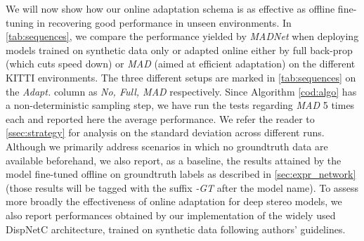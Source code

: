\documentclass[10pt,twocolumn,letterpaper]{article}
\def\netname{\emph{MADNet}}
\def\algoname{\emph{MAD}}
\begin{document}
We will now show how our online adaptation schema is as effective as offline fine-tuning in recovering good performance in unseen environments. In \autoref{tab:sequences}, we compare the performance yielded by \netname{} when deploying  models trained on synthetic data only \cite{mayer2016large} or adapted online either by full back-prop (which cuts speed down) or \algoname{} (aimed at efficient adaptation) on the different KITTI environments. The three different setups are marked in \autoref{tab:sequences} on the \textit{Adapt.} column as \textit{No, Full, \algoname{}} respectively. Since Algorithm \autoref{cod:algo} has a non-deterministic sampling step, we have run the tests regarding \algoname{} 5 times each and reported here the average performance. We refer the reader to \autoref{ssec:strategy} for analysis on the standard deviation across different runs.  Although we primarily address scenarios in which no groundtruth data are available beforehand, we also report, as a baseline, the results attained by the model fine-tuned offline on groundtruth labels as described in \autoref{sec:expr_network} (those results will be tagged with the suffix \textit{-GT} after the model name). To assess more broadly the effectiveness of online adaptation for deep stereo models, we also report performances obtained by our implementation of the widely used DispNetC \cite{mayer2016large} architecture, trained on synthetic data following authors' guidelines.  
\end{document}
